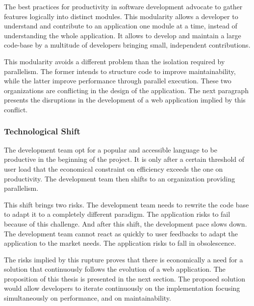 The best practices for productivity in software development advocate to gather features logically into distinct modules.
This modularity allows a developer to understand and contribute to an application one module at a time, instead of understanding the whole application.
It allows to develop and maintain a large code-base by a multitude of developers bringing small, independent contributions.

This modularity avoids a different problem than the isolation required by parallelism.
The former intends to structure code to improve maintainability, while the latter improve performance through parallel execution.
These two organizations are conflicting in the design of the application.
The next paragraph presents the disruptions in the development of a web application implied by this conflict.

\subsubsection{Technological Shift}

The development team opt for a popular and accessible language to be productive in the beginning of the project. %
It is only after a certain threshold of user load that the economical constraint on efficiency exceeds the one on productivity.
The development team then shifts to an organization providing parallelism.

This shift brings two risks.
The development team needs to rewrite the code base to adapt it to a completely different paradigm.
The application risks to fail because of this challenge.
And after this shift, the development pace slows down.
The development team cannot react as quickly to user feedbacks to adapt the application to the market needs.
The application risks to fall in obsolescence.

The risks implied by this rupture proves that there is economically a need for a solution that continuously follows the evolution of a web application.
The proposition of this thesis is presented in the next section.
The proposed solution would allow developers to iterate continuously on the implementation focusing simultaneously on performance, and on maintainability.

